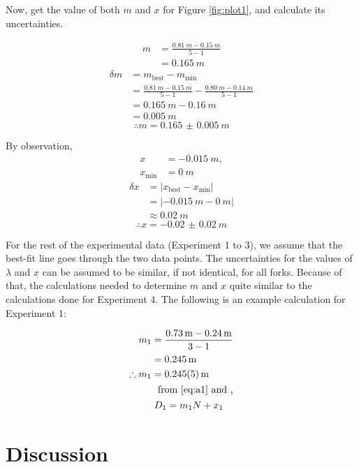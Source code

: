 \documentclass[letter]{article}
\numberwithin{equation}{section}
\begin{document}
Now, get the value of both \(m\) and \(x\) for Figure \ref{fig:plot1}, and calculate its uncertainties.

\begin{align*}
  m &= \frac{\SI{0.81}{m} - \SI{0.15}{m}}{5 - 1} \\
  &= \SI{0.165}{m}
\end{align*}
\begin{align*}
  \delta m &= m_{\mathrm{best}} - m_{\mathrm{min}} \\
  &= \frac{\SI{0.81}{m} - \SI{0.15}{m}}{5 - 1} - \frac{\SI{0.80}{m} - \SI{0.14}{m}}{5 - 1} \\
  &= \SI{0.165}{m} - \SI{0.16}{m} \\
  &= \SI{0.005}{m}
\end{align*}
\begin{equation*}
  \therefore m = \SI{0.165(5)}{m}
\end{equation*}

By observation,
\begin{align*}
  x &= \SI{-0.015}{m}, \\
  x_\mathrm{min} &= \SI{0}{m}
\end{align*}
\begin{align*}
  \delta x &= |x_{\mathrm{best}} - x_{\mathrm{min}}| \\
  &= |\SI{-0.015}{m} - \SI{0}{m}| \\
  &\approx \SI{0.02}{m}
\end{align*}
\begin{equation*}
  \therefore x = \SI{-0.02(2)}{m}
\end{equation*}

For the rest of the experimental data (Experiment 1 to 3), we assume that the best-fit line goes through the two data points. The uncertainties for the values of \(\lambda\) and \(x\) can be assumed to be similar, if not identical, for all forks. Because of that, the calculations needed to determine \(m\) and \(x\) quite similar to the calculations done for Experiment 4. The following is an example calculation for Experiment 1:

\begin{align*}
  \begin{split}
    m_1 &= \frac{\SI{0.73}{m} - \SI{0.24}{m}}{3 - 1} \\
    &= \SI{0.245}{m} \\
    \therefore m_1 &= \SI{0.245(5)}{m}
  \end{split} \\
  \text{from \eqref{eq:a1} and ,} \\
  \begin{split}
    D_1 &= m_1 N + x_1
  \end{split}
\end{align*}
\section{Discussion}
\end{document}
